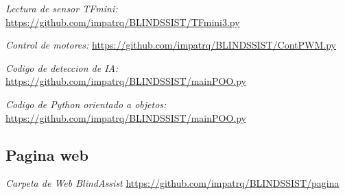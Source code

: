 \documentclass[12pt,a4paper]{article}
\begin{document}
\begin{thebibliography}{9}
\emph{Lectura de sensor TFmini:}
\href{https://github.com/impatrq/BLINDSSIST/blob/main/firmware/TFmini3.py}{https://github.com/impatrq/BLINDSSIST/TFmini3.py}

\emph{Control de motores:}
\href{https://github.com/impatrq/BLINDSSIST/blob/main/firmware/TFmini/ContPWM.py}{https://github.com/impatrq/BLINDSSIST/ContPWM.py}

\emph{Codigo de deteccion de IA:}
\href{https://github.com/impatrq/BLINDSSIST/blob/main/firmware/main.py}{https://github.com/impatrq/BLINDSSIST/mainPOO.py}

\emph{Codigo de Python orientado a objetos: }
\href{https://github.com/impatrq/BLINDSSIST/blob/main/firmware/mainPOO.py}{https://github.com/impatrq/BLINDSSIST/mainPOO.py}

\subsection{Pagina web}
\emph{Carpeta de Web BlindAssist}
\href{https://github.com/impatrq/BLINDSSIST/tree/main/firmware/pagina%20web}{https://github.com/impatrq/BLINDSSIST/pagina}
\end{thebibliography}
\end{document}
